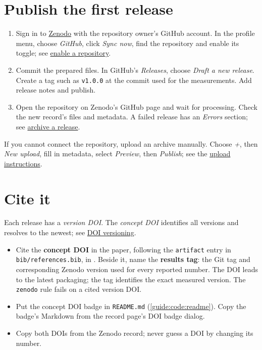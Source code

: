 \section{Publish the first release}
\begin{enumerate}
  \item Sign in to \href{https://zenodo.org/}{Zenodo} with the repository owner's GitHub account. In the profile menu, choose \emph{GitHub}, click \emph{Sync now}, find the repository and enable its toggle; see \href{https://help.zenodo.org/docs/github/enable-repository/}{enable a repository}.
  \item Commit the prepared files. In GitHub's \emph{Releases}, choose \emph{Draft a new release}. Create a tag such as \texttt{v1.0.0} at the commit used for the measurements. Add release notes and publish.
  \item Open the repository on Zenodo's GitHub page and wait for processing. Check the new record's files and metadata. A failed release has an \emph{Errors} section; see \href{https://help.zenodo.org/docs/github/archive-software/github-upload/}{archive a release}.
\end{enumerate}
If you cannot connect the repository, upload an archive manually. Choose \emph{+}, then \emph{New upload}, fill in metadata, select \emph{Preview}, then \emph{Publish}; see the \href{https://help.zenodo.org/docs/deposit/create-new-upload/}{upload instructions}.

\section{Cite it}\label{guide:zenodo:cite}
Each release has a \emph{version DOI}. The \emph{concept DOI} identifies all versions and resolves to the newest; see \href{https://support.zenodo.org/help/en-gb/1-upload-deposit/97-what-is-doi-versioning}{DOI versioning}.
\begin{itemize}
  \item Cite the \textbf{concept DOI} in the paper, following the \texttt{artifact} entry in \texttt{bib/references.bib}, in . Beside it, name the \textbf{results tag}: the Git tag and corresponding Zenodo version used for every reported number. The DOI leads to the latest packaging; the tag identifies the exact measured version. The \texttt{zenodo} rule fails on a cited version DOI.
  \item Put the concept DOI badge in \texttt{README.md} (\cref{guide:code:readme}). Copy the badge's Markdown from the record page's DOI badge dialog.
  \item Copy both DOIs from the Zenodo record; never guess a DOI by changing its number.
\end{itemize}

